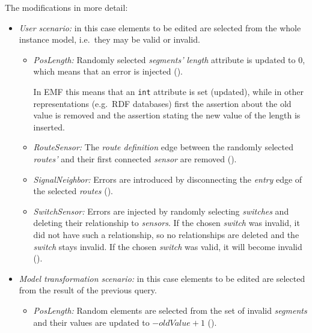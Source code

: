 The modifications in more detail:
\begin{itemize}
  \item \emph{User scenario:} in this case elements to be edited are selected from the whole instance model, i.e.\ they may be valid or invalid. 
  \begin{itemize}
    
    \item \emph{PosLength:} Randomly selected \emph{segments'} \emph{length} attribute is updated to 0, which means that an error is injected ().
    
    In EMF this means that an \texttt{int} attribute is set (updated), while in other representations (e.g.\ RDF databases) first the assertion about the old value is removed and the assertion stating the new value of the length is inserted.
    
    \item \emph{RouteSensor:} The \emph{route definition} edge between the randomly selected \emph{routes'} and their first connected \emph{sensor} are removed ().
    
    \item \emph{SignalNeighbor:} Errors are introduced by disconnecting the \emph{entry} edge of the selected \emph{routes} ().

    \item \emph{SwitchSensor:} Errors are injected by randomly selecting \emph{switches} and deleting their relationship to \emph{sensors}. If the chosen \emph{switch} was invalid, it did not have such a relationship, so no relationships are deleted and the \emph{switch} stays invalid. If the chosen \emph{switch} was valid, it will become invalid ().
        
  \end{itemize}
  \item \emph{Model transformation scenario:} in this case elements to be edited are selected from the result of the previous query.
  \begin{itemize}
    
    \item \emph{PosLength:} Random elements are selected from the set of invalid \emph{segments} and their values are updated to $- \mathit{oldValue} + 1$ ().
    

\end{itemize}
\end{itemize}
